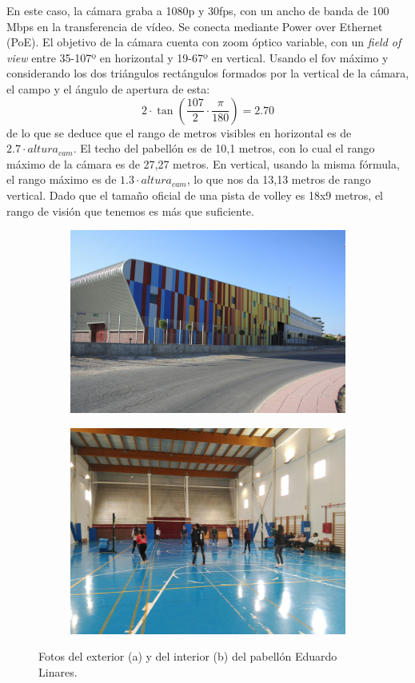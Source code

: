 En este caso, la cámara graba a 1080p y 30fps, con un ancho de banda de 100 Mbps en la transferencia de vídeo. Se conecta mediante Power over Ethernet (PoE). El objetivo de la cámara cuenta con zoom óptico variable, con un \textit{field of view} entre 35-107º en horizontal y 19-67º en vertical. Usando el fov máximo y considerando los dos triángulos rectángulos formados por la vertical de la cámara, el campo y el ángulo de apertura de esta:
\[
    2 \cdot \tan(\frac{107}{2} \cdot \frac{\pi}{180}) = 2.70
\]
de lo que se deduce que el rango de metros visibles en horizontal es de $2.7\cdot altura_{cam}$. El techo del pabellón es de 10,1 metros, con lo cual el rango máximo de la cámara es de 27,27 metros. En vertical, usando la misma fórmula, el rango máximo es de $1.3 \cdot altura_{cam}$, lo que nos da 13,13 metros de rango vertical. Dado que el tamaño oficial de una pista de volley es 18x9 metros, el rango de visión que tenemos es más que suficiente.

\begin{figure}
\begin{subfigure}{.5\textwidth}
  \centering
  \includegraphics[width=.9\linewidth]{images/EduardoLinares}
  \caption { }
  \label{fig:pabellonFuera}
\end{subfigure}%
\begin{subfigure}{.5\textwidth}
  \centering
  \includegraphics[width=.9\linewidth]{images/EduardoLinaresDentro}
  \caption { }
  \label{fig:pabellonDentro}
\end{subfigure}
\caption{Fotos del exterior (a) y del interior (b) del pabellón Eduardo Linares. }
\label{fig:pabellon}
\end{figure}


